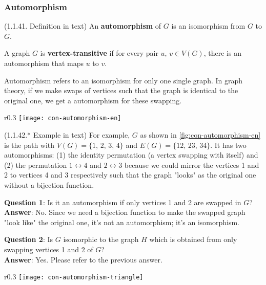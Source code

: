 \documentclass[../src/handouts/main.tex]{subfiles}
\begin{document}
\subsubsection{Automorphism}

\begin{definition}{}{}
  (1.1.41. Definition in text)
  An \textbf{automorphism} of $G$ is an isomorphism from $G$ to $G$.

  A graph $G$ is \textbf{vertex-transitive} if for every pair $u,\, v \in V(G)$, there is an automorphism that maps $u$ to $v$.
\end{definition}

Automorphism refers to an isomorphism for only one single graph. {} In graph theory, if we make swaps of vertices such that the graph is identical to the original one, we get a automorphism for these swapping.

\begin{wrapfigure}{r}{0.3\textwidth}
  \centering
  \texttt{[image: con-automorphism-en]}
  \caption{A graph $G$ in N shape.}
  \label{fig:con-automorphism-en}
\end{wrapfigure}

(1.1.42.* Example in text) For example, $G$ as shown in \cref{fig:con-automorphism-en} is the path with $V(G) = \{ 1,\, 2,\, 3,\, 4 \}$ and $E(G) = \{ 12,\, 23,\, 34 \}$. It has two automorphisms: (1) the identity permutation (a vertex swapping with itself) and (2) the permutation $1 \leftrightarrow 4$ and $2 \leftrightarrow 3$ because we could mirror the vertices 1 and 2 to vertices 4 and 3 respectively such that the graph "looks" as the original one without a bijection function.

\textbf{Question 1}: Is it an automorphism if only vertices 1 and 2 are swapped in $G$?\\
\textbf{Answer}: No. Since we need a bijection function to make the swapped graph "look like" the original one, it's not an automorphism; it's an isomorphism.

\textbf{Question 2}: Is $G$ isomorphic to the graph $H$ which is obtained from only swapping vertices 1 and 2 of $G$?\\
\textbf{Answer}: Yes. Please refer to the previous answer.

\begin{wrapfigure}{r}{0.3\textwidth}
  \centering
  \texttt{[image: con-automorphism-triangle]}
  \caption{A graph $G$ in triangle.}
  \label{fig:con-automorphism-triangle}
\end{wrapfigure}
\end{document}
